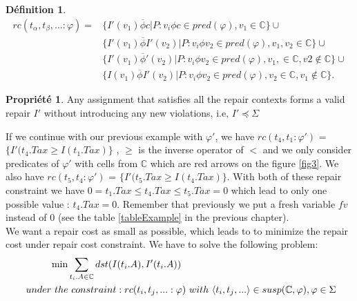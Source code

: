 \documentclass[letterpaper, 12pt]{report}
\theoremstyle{definition}
\newtheorem{mydef}{Définition}
\newtheorem{myprop}{Propriété}
\begin{document}
\begin{mydef}
	\begin{displaymath}
	\begin{split}
	rc(t_\alpha,t_\beta,...:\varphi) =
	&\{ I'(v_1)\overline{\phi}c|P : v_i\phi c \in pred(\varphi),v_1 \in \mathbb{C}\}\cup\\
	&\{I'(v_1)\overline{\phi} I'(v_2)|P : v_i\phi v_2 \in pred(\varphi),v_1,v_2 \in \mathbb{C}\}\cup\\
	&\{I'(v_1)\overline{\phi} '(v_2)|P : v_i\phi v_2 \in pred(\varphi),v_1,\in \mathbb{C},v2 \not\in \mathbb{C}\}\cup\\
	&\{I(v_1)\overline{\phi} I'(v_2)|P : v_i\phi v_2 \in pred(\varphi),v_2 \in \mathbb{C},v_1 \not\in \mathbb{C}\}.
	\end{split}
	\end{displaymath}
\end{mydef}

\begin{myprop}
Any assignment that satisfies all the repair contexts forms a valid repair $I'$ without introducing any new violations, i.e, $I' \preceq \Sigma$
\end{myprop}

If we continue with our previous example with $\varphi'$, we have $rc(t_4,t_1:\varphi')$ = $\{I'(t_4.Tax \geq I(t_1.Tax)\}$ , $\geq$ is the inverse operator of $<$ and we only consider predicates of $\varphi'$ with cells from $\mathbb{C}$ which are red arrows on the figure \ref{fig3}. We also have $rc(t_5,t_4:\varphi')$ = $\{I'(t_5.Tax \geq I(t_4.Tax)\}$. With both of these repair constraint we have $0 = t_1.Tax \leq t_4.Tax \leq t_5.Tax =0$ which lead to only one possible value : $t_4.Tax =0$. Remember that previously we put a fresh variable $fv$ instead of 0 (see the table \ref{tableExample} in the previous chapter).\\

We want a repair cost as small as possible, which leads to to minimize the repair cost under repair cost constraint. We have to solve the following problem:
\begin{displaymath}
\begin{split}
& \hspace*{1cm} \min \sum_{t_i.A \in \mathbb{C}} dst(I(t_i.A),I'(t_i.A)) \\
 &\ under\ the\ constraint : rc(t_i,t_j,...:\varphi)\ with\ \langle t_i,t_j,... \rangle \in susp(\mathbb{C},\varphi),\varphi \in \Sigma
\end{split}
\end{displaymath}
\end{document}
